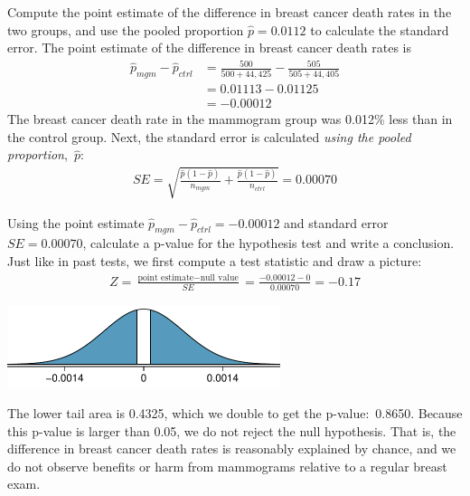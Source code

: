 \begin{example}{Compute the point estimate of the difference in breast cancer death rates in the two groups, and use the pooled proportion $\hat{p} = 0.0112$ to calculate the standard error.}
The point estimate of the difference in breast cancer death rates is
\begin{align*}
\hat{p}_{mgm} - \hat{p}_{ctrl}
	&= \frac{500}{500 + 44,425} - \frac{505}{505 + 44,405} \\
	&= 0.01113 - 0.01125 \\
	&= -0.00012
\end{align*}
The breast cancer death rate in the mammogram group was 0.012\% less than in the control group. Next, the standard error is calculated \emph{using the pooled proportion},~$\hat{p}$:
\begin{align*}
SE = \sqrt{\frac{\hat{p}(1-\hat{p})}{n_{mgm}}
		+ \frac{\hat{p}(1-\hat{p})}{n_{ctrl}}}
	= 0.00070
\end{align*}
\end{example}

\begin{example}{Using the point estimate $\hat{p}_{mgm} - \hat{p}_{ctrl} = -0.00012$ and standard error $SE = 0.00070$, calculate a p-value for the hypothesis test and write a conclusion.}
Just like in past tests, we first compute a test statistic and draw a picture:
\begin{align*}
Z = \frac{\text{point estimate} - \text{null value}}{SE}
	= \frac{-0.00012 - 0}{0.00070}
	= -0.17
\end{align*}
\begin{center}
\includegraphics[width=0.6\textwidth]{ch_inference_for_props/figures/mammograms/mammogramPValue}
\end{center}
The lower tail area is 0.4325, which we double to get the p-value:~0.8650. Because this p-value is larger than 0.05, we do not reject the null hypothesis. That is, the difference in breast cancer death rates is reasonably explained by chance, and we do not observe benefits or harm from mammograms relative to a regular breast exam.
\end{example}

